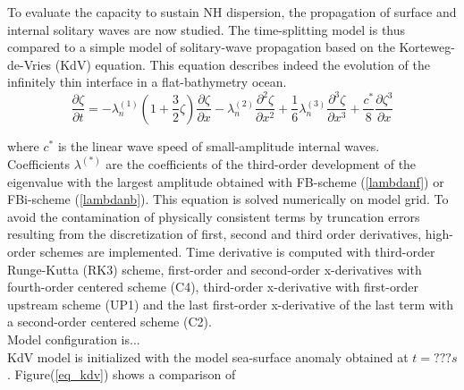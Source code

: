 \documentclass[a4paper]{article}
\numberwithin{equation}{section}
\begin{document}
To evaluate the capacity to sustain NH dispersion, the propagation of surface and internal solitary waves are now studied. The time-splitting model is thus compared to a simple model of solitary-wave propagation based on the Korteweg-de-Vries (KdV) equation. This equation describes indeed the evolution of the infinitely thin interface in a flat-bathymetry ocean.
\begin{equation}
\frac{\partial \zeta}{\partial t} =
-\lambda_{n}^{(1)}(1+\frac{3}{2}\zeta)\frac{\partial \zeta}{\partial x}
- \lambda_n^{(2)} \frac{\partial ^2 \zeta}{\partial x^2} 
+ \frac{1}{6} \lambda_n^{(3)} \frac{\partial ^3 \zeta}{\partial x^3} 
+ \frac{c^*} {8} \frac{\partial  \zeta^3}{\partial x} 
\label{eq_kdv}
\end{equation}

where $c^*$ is the linear wave speed of small-amplitude internal waves.\\
Coefficients $\lambda^{(*)}$ are the coefficients of the third-order development of the eigenvalue with the largest amplitude obtained with FB-scheme (\ref{lambdanf}) or FBi-scheme (\ref{lambdanb}).
This equation is solved numerically on model grid. To avoid the contamination of physically consistent terms by truncation errors resulting from the discretization of first, second and third order derivatives, high-order schemes are implemented. Time derivative is computed with third-order Runge-Kutta (RK3) scheme, first-order and second-order x-derivatives with fourth-order centered scheme (C4), third-order x-derivative with first-order upstream scheme (UP1) and the last first-order x-derivative of the last term with a second-order centered scheme (C2).\\
Model configuration is...\\
KdV model is initialized with the model sea-surface anomaly obtained at $t=???s$.
Figure(\ref{eq_kdv}) shows a comparison of 


\newpage
\end{document}
